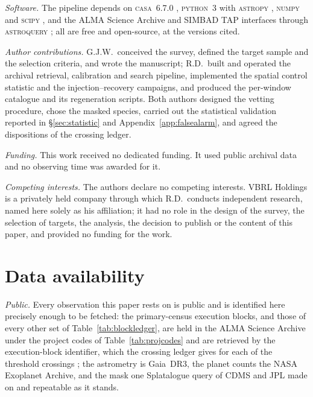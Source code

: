 \emph{Software.} The pipeline depends on \textsc{casa}~6.7.0
\citep{CASA2022}, \textsc{python}~3 with \textsc{astropy} \citep{Astropy2022}, \textsc{numpy}
\citep{Harris2020} and \textsc{scipy} \citep{Virtanen2020}, and the ALMA Science
Archive and SIMBAD TAP interfaces through \textsc{astroquery} \citep{Ginsburg2019};
all are free and open-source, at the versions cited.

\emph{Author contributions.} G.J.W.\ conceived the survey, defined the target
sample and the selection criteria, and wrote the manuscript; R.D.\ built and
operated the archival retrieval, calibration and search pipeline, implemented
the spatial control statistic and the injection--recovery campaigns, and
produced the per-window catalogue and its regeneration scripts. Both authors
designed the vetting procedure, chose the masked species, carried out the
statistical validation reported in \S\ref{sec:statistic} and
Appendix~\ref{app:falsealarm}, and agreed the dispositions of the crossing
ledger.

\emph{Funding.} This work received no dedicated funding. It used public archival data and
no observing time was awarded for it.

\emph{Competing interests.} The authors declare no competing interests. VBRL Holdings is a privately
held company through which R.D.\ conducts independent research, named
here solely as his affiliation; it had no role in the design of the
survey, the selection of targets, the analysis, the decision to publish
or the content of this paper, and provided no funding for the work.

\section*{Data availability}
\label{sec:data}
\emph{Public.} Every observation this paper rests on is public and is
identified here precisely enough to be fetched: the \NEB{} primary-census
execution blocks, and those of every other set of
Table~\ref{tab:blockledger}, are held in the ALMA Science Archive under the
\NProjCodes{} project codes of Table~\ref{tab:projcodes} and are retrieved by
the execution-block identifier, which the crossing ledger gives for each of the
\EvNCrossRaw{} threshold crossings \citep{Chen2022}; the astrometry is
Gaia~DR3, the planet counts the NASA Exoplanet Archive, and the mask one
Splatalogue query of CDMS and JPL made on \McQueryDate{} and repeatable as it
stands.

